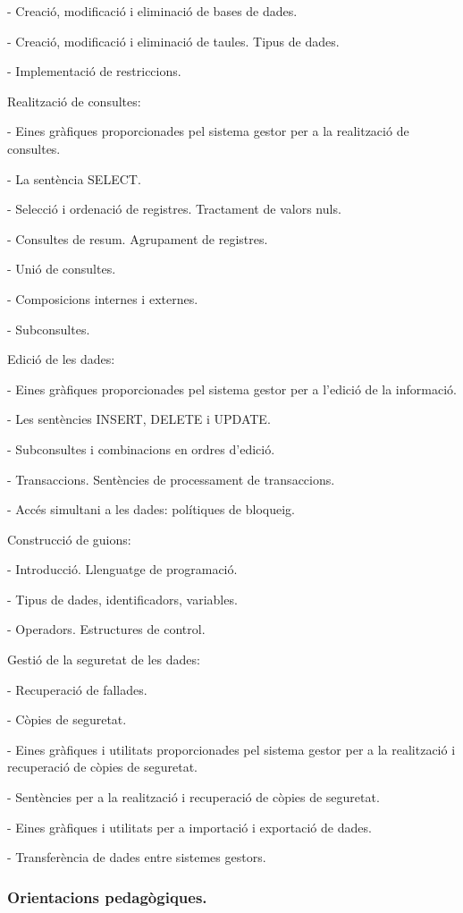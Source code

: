 \documentclass[catalan, a4paper, 12pt, titlepage]{article}
\begin{document}
- Creació, modificació i eliminació de bases de dades.

- Creació, modificació i eliminació de taules. Tipus de dades.

- Implementació de restriccions.

Realització de consultes:

- Eines gràfiques proporcionades pel sistema gestor per a la realització de consultes.

- La sentència SELECT.

- Selecció i ordenació de registres. Tractament de valors nuls.

- Consultes de resum. Agrupament de registres.

- Unió de consultes.

- Composicions internes i externes.

- Subconsultes.

Edició de les dades:

- Eines gràfiques proporcionades pel sistema gestor per a l'edició de la informació.

- Les sentències INSERT, DELETE i UPDATE.

- Subconsultes i combinacions en ordres d'edició.

- Transaccions. Sentències de processament de transaccions.

- Accés simultani a les dades: polítiques de bloqueig.

Construcció de guions:

- Introducció. Llenguatge de programació.

- Tipus de dades, identificadors, variables.

- Operadors. Estructures de control.

Gestió de la seguretat de les dades:

- Recuperació de fallades.

- Còpies de seguretat.

- Eines gràfiques i utilitats proporcionades pel sistema gestor per a la realització i recuperació de còpies de seguretat.

- Sentències per a la realització i recuperació de còpies de seguretat.

- Eines gràfiques i utilitats per a importació i exportació de dades.

- Transferència de dades entre sistemes gestors.

\subsubsection{Orientacions pedagògiques.}
\end{document}
